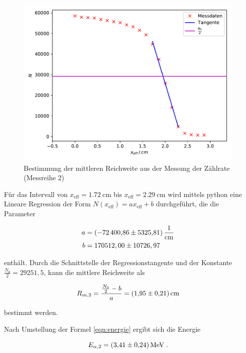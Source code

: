     \begin{figure} [H]
      \centering
      \includegraphics[scale=0.8]{content/plot2.pdf}
      \caption{Bestimmung der mittleren Reichweite aus der Messung der Zählrate (Messreihe 2)}
      \label{fig:plot3}
    \end{figure}
    
    Für das Intervall von $x_\text{eff} = \SI{1.72}{\centi\meter}$ bis $x_\text{eff} = \SI{2.29}{\centi\meter}$
    wird mittels python eine Lineare Regression der Form $N(x_\text{eff}) = a x_\text{eff} + b$ durchgeführt,
    die die Parameter 
    
    \begin{align*}
        a &= \SI{- 72400.86 +- 5325.81}{\per \centi \meter} \\
        b &= 170512,00 \pm 10726,97
    \end{align*}
    
    enthält. Durch die Schnittstelle der Regressionstangente und der Konstante $\frac{N_0}{2} = 29251,5$,
    kann die mittlere Reichweite als
    
    \begin{equation*}
        R_{m,2} = \frac{\frac{N_0}{2} - b}{a} = \SI{1.95 +- 0.21}{\centi\meter}
    \end{equation*}
    
    bestimmt werden.
    
    Nach Umstellung der Formel \eqref{eqn:energie} ergibt sich die Energie 
    
    \begin{equation*}
         E_{\alpha,2} = \SI{3.41 +- 0.24}{\mega\eV} \; .
    \end{equation*}
    
